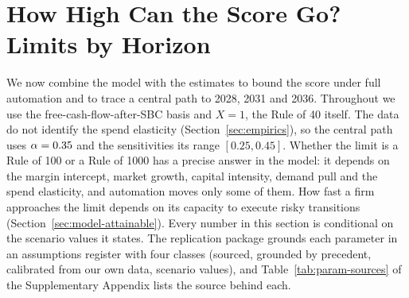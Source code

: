 \section{How High Can the Score Go? Limits by Horizon}\label{sec:horizons}

We now combine the model with the estimates to bound the score under full automation and to trace a central path to 2028, 2031 and 2036. Throughout we use the free-cash-flow-after-SBC basis and $X=1$, the Rule of 40 itself. The data do not identify the spend elasticity (Section~\ref{sec:empirics}), so the central path uses $\alpha=0.35$ and the sensitivities its range $[0.25,0.45]$. Whether the limit is a Rule of 100 or a Rule of 1000 has a precise answer in the model: it depends on the margin intercept, market growth, capital intensity, demand pull and the spend elasticity, and automation moves only some of them. How fast a firm approaches the limit depends on its capacity to execute risky transitions (Section~\ref{sec:model-attainable}). Every number in this section is conditional on the scenario values it states. The replication package grounds each parameter in an assumptions register with four classes (sourced, grounded by precedent, calibrated from our own data, scenario values), and Table~\ref{tab:param-sources} of the Supplementary Appendix lists the source behind each.

